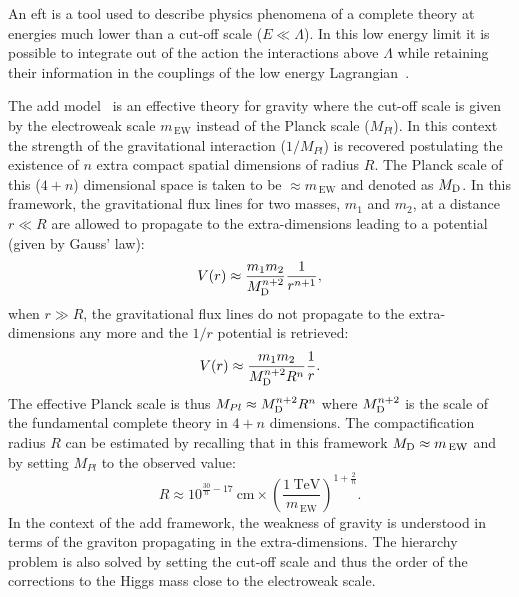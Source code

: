 An \gls{eft} is a tool used to describe physics phenomena of a complete theory
at energies much lower than a cut-off scale ($E \ll \Lambda$). In this low
energy limit it is possible to integrate out of the action the interactions
above $\Lambda$ while retaining their information in the couplings of the low
energy Lagrangian~\cite{EFTReview}.

The \gls{add} model~\cite{ADDPaper} is an effective theory for gravity where the
cut-off scale is given by the electroweak scale $m_\mathrm{\, EW}$ instead of
the Planck scale ($M_{Pl}$). In this context the strength of the gravitational
interaction ($1/M_{Pl}$) is recovered postulating the existence of $n$ extra
compact spatial dimensions of radius $R$. The Planck scale of this ($4 + n$)
dimensional space is taken to be $\approx m_\mathrm{\, EW}$ and denoted as
$M_\mathrm{D}$. In this framework, the gravitational flux lines for two masses, $m_1$ and
$m_2$, at a distance $r \ll R$ are allowed to propagate to the extra-dimensions
leading to a potential (given by Gauss' law):
\begin{equation}
  \label{eq:108}
  V(r) \approx \frac{m_1 m_2}{M_\mathrm{D}^{n + 2}} \frac{1}{r^{n + 1}},
\end{equation}
when $r \gg R$, the gravitational flux lines do not propagate to the
extra-dimensions any more and the $1/r$ potential is retrieved:
\begin{equation}
  \label{eq:109}
  V(r) \approx \frac{m_1 m_2}{M_\mathrm{D}^{n + 2} R^n} \frac{1}{r}.
\end{equation}
The effective Planck scale is thus $M_{Pl} \approx M_\mathrm{D}^{n + 2} R^n$ where
$M_\mathrm{D}^{n + 2}$ is the scale of the fundamental complete theory in $4 + n$
dimensions. The compactification radius $R$ can be estimated by recalling that
in this framework $M_\mathrm{D} \approx m_\mathrm{\, EW}$ and by setting $M_{Pl}$ to the
observed value:
\begin{equation}
  \label{eq:110}
  R \approx 10^{\frac{30}{n} - 17}~\mathrm{cm} \times \left(
    \frac{1~\mathrm{TeV}}{m_\mathrm{\, EW}} \right)^{1 + \frac{2}{n}}.
\end{equation}
In the context of the \gls{add} framework, the weakness of gravity is understood
in terms of the graviton propagating in the extra-dimensions. The hierarchy
problem is also solved by setting the cut-off scale and thus the order of the
corrections to the Higgs mass close to the electroweak scale.
